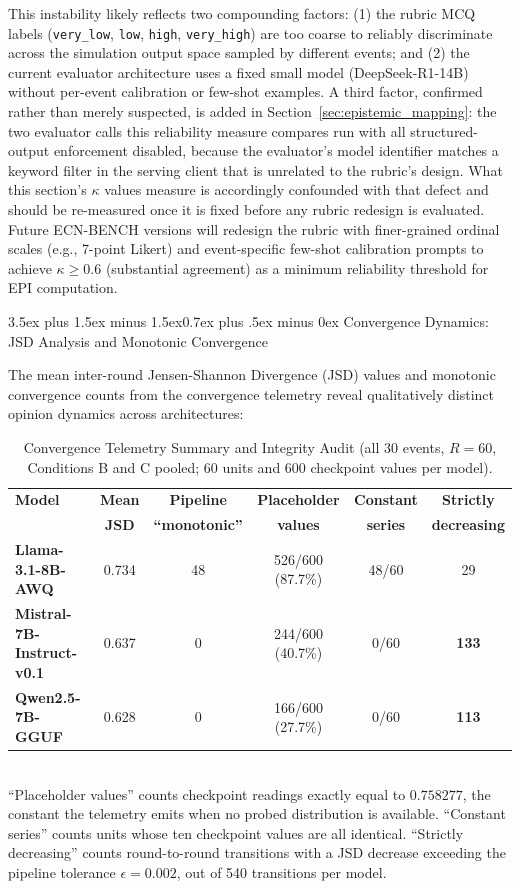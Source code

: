 \documentclass[11pt,journal,onecolumn]{IEEEtran}
\makeatletter
\renewcommand\subsection{\@startsection{subsection}{2}{\z@}%
  {3.5ex plus 1.5ex minus 1.5ex}{0.7ex plus .5ex minus 0ex}%
  {\normalfont\normalsize\bfseries}}
\makeatother
\begin{document}
This instability likely reflects two compounding factors: (1) the rubric MCQ labels (\texttt{very\_low}, \texttt{low}, \texttt{high}, \texttt{very\_high}) are too coarse to reliably discriminate across the simulation output space sampled by different events; and (2) the current evaluator architecture uses a fixed small model (DeepSeek-R1-14B) without per-event calibration or few-shot examples. A third factor, confirmed rather than merely suspected, is added in Section~\ref{sec:epistemic_mapping}: the two evaluator calls this reliability measure compares run with all structured-output enforcement disabled, because the evaluator's model identifier matches a keyword filter in the serving client that is unrelated to the rubric's design. What this section's $\kappa$ values measure is accordingly confounded with that defect and should be re-measured once it is fixed before any rubric redesign is evaluated. Future ECN-BENCH versions will redesign the rubric with finer-grained ordinal scales (e.g., 7-point Likert) and event-specific few-shot calibration prompts to achieve $\kappa \geq 0.6$ (substantial agreement) as a minimum reliability threshold for EPI computation.

\subsection{Convergence Dynamics: JSD Analysis and Monotonic Convergence}
\label{sec:jsd_convergence}

The mean inter-round Jensen-Shannon Divergence (JSD) values and monotonic convergence counts from the convergence telemetry reveal qualitatively distinct opinion dynamics across architectures:

\begin{table}[!htbp]
\centering
\caption{Convergence Telemetry Summary and Integrity Audit (all 30 events, $R=60$, Conditions B and C pooled; 60 units and 600 checkpoint values per model).}
\label{tab:convergence_jsd}
\small
\begin{tabular}{lccccc}
\toprule
\textbf{Model} & \textbf{Mean} & \textbf{Pipeline} & \textbf{Placeholder} & \textbf{Constant} & \textbf{Strictly} \\
 & \textbf{JSD} & \textbf{``monotonic''} & \textbf{values} & \textbf{series} & \textbf{decreasing} \\
\midrule
\textbf{Llama-3.1-8B-AWQ} & 0.734 & 48 & 526/600 (87.7\%) & 48/60 & 29 \\
\textbf{Mistral-7B-Instruct-v0.1}   & 0.637 & 0  & 244/600 (40.7\%) & 0/60  & \textbf{133} \\
\textbf{Qwen2.5-7B-GGUF}  & 0.628 & 0  & 166/600 (27.7\%) & 0/60  & \textbf{113} \\
\bottomrule
\end{tabular}
\smallskip\\
\footnotesize ``Placeholder values'' counts checkpoint readings exactly equal to $0.758277$, the constant the telemetry emits when no probed distribution is available. ``Constant series'' counts units whose ten checkpoint values are all identical. ``Strictly decreasing'' counts round-to-round transitions with a JSD decrease exceeding the pipeline tolerance $\epsilon = 0.002$, out of 540 transitions per model.
\end{table}
\end{document}
